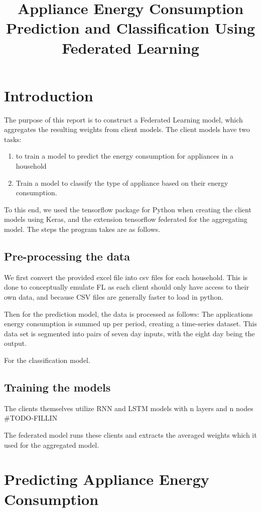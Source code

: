 \documentclass[a4paper, article, oneside, USenglish, IN5460]{memoir}
\title{Appliance Energy Consumption Prediction and Classification Using Federated Learning}
\begin{document}
\projectfrontpage


\chapter{Introduction}

The purpose of this report is to construct a Federated Learning model, which aggregates the resulting weights from client models. The client models have two tasks:
\begin{enumerate}
    \item to train a model to predict the energy consumption for appliances in a household
    \item Train a model to classify the type of appliance based on their energy consumption.    
\end{enumerate}

To this end, we used the tensorflow package for Python when creating the client models using Keras, and the extension tensorflow federated for the aggregating model. The steps the program takes are as follows. 


\section{Pre-processing the data}
We first convert the provided excel file into csv files for each household. This is done to conceptually emulate FL as each client should only have access to their own data, and because CSV files are generally faster to load in python.

Then for the prediction model, the data is processed as follows:
The applications energy consumption is summed up per period, creating a time-series dataset. This data set is segmented into pairs of seven day inputs, with the eight day being the output.

For the classification model.

\section{Training the models}

The clients themselves utilize RNN and LSTM models with n layers and n nodes #TODO-FILLIN

The federated model runs these clients and extracts the averaged weights which it used for the aggregated model.



\chapter{Predicting Appliance Energy Consumption}
\end{document}
